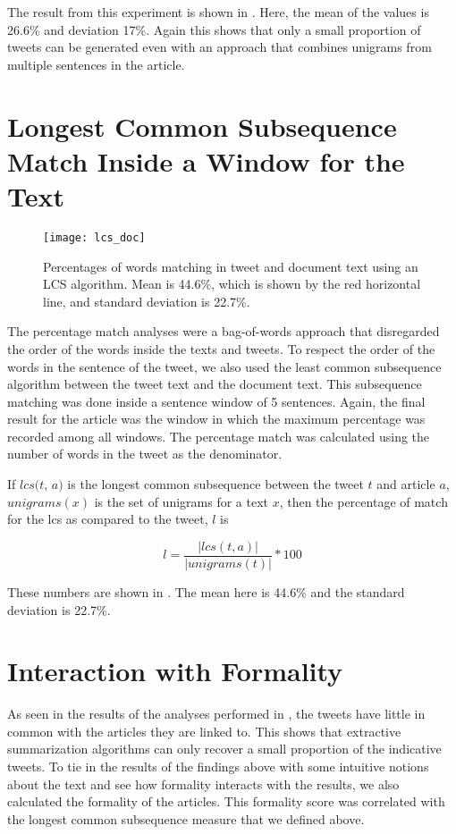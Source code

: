 The result from this experiment is shown in . Here, the mean of the values is 26.6\% and deviation 17\%. Again this shows that only a small proportion of tweets can be generated even with an approach that combines unigrams from multiple sentences in the article.


\section{Longest Common Subsequence Match Inside a Window for the Text}
\label{sec:lcs}

\begin{figure}[!htbp]
\centering
\texttt{[image: lcs\_doc]}
\caption[match]{Percentages of words matching in tweet and document text using an LCS algorithm. Mean is 44.6\%, which is shown by the red horizontal line, and standard deviation is 22.7\%.}
\label{fig:lcs}
\end{figure}

The percentage match analyses were a bag-of-words approach that disregarded the order of the words inside the texts and tweets. To respect the order of the words in the sentence of the tweet, we also used the least common subsequence algorithm between the tweet text and the document text. This subsequence matching was done inside a sentence window of 5 sentences. 
Again, the final result for the article was the window in which the maximum percentage was recorded among all windows. The percentage match was calculated using the number of words in the tweet as the denominator.

If $\textit{lcs(t, a)}$ is the longest common subsequence between the tweet $t$ and article $a$, $\textit{unigrams}(x)$ is the set of unigrams for a text $x$, then the percentage of match for the lcs as compared to the tweet, $\textit{l}$ is


\begin{equation}
l = \frac{| \textit{lcs}(t, a) |}{| \textit{unigrams}(t) |} * 100
\end{equation}


 These numbers are shown in . The mean here is 44.6\% and the standard deviation is 22.7\%. 

\section{Interaction with Formality}

As seen in the results of the analyses performed in , the tweets have little in common with the articles they are linked to. This shows that extractive summarization algorithms can only recover a small proportion of the indicative tweets. To tie in the results of the findings above with some intuitive notions about the text and see how formality interacts with the results, we also calculated the formality of the articles. This formality score was correlated with the longest common subsequence measure that we defined above. 

